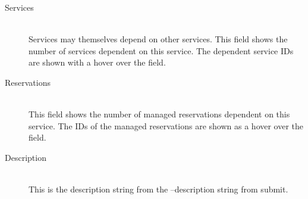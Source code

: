\begin{description}
            \item[Services] \hfill \\
              Services may themselves depend on other services.  This field shows the number of
              services dependent on this service.  The dependent service IDs are shown with a 
              hover over the field.

            \item[Reservations] \hfill \\
              This field shows the number of
              managed reservations dependent on this service. The IDs of the managed reservations
              are shown as a hover over the field.

              
            \item[Description] \hfill \\
              This is the description string from the --description string from submit.
        \end{description}
